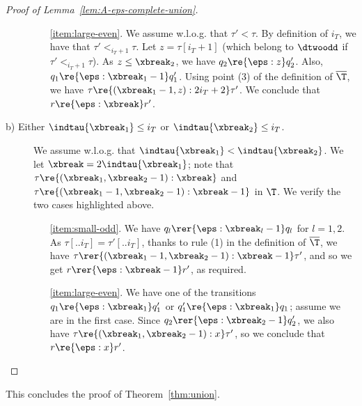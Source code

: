 \begin{proof}[Proof of Lemma~\ref{lem:A-eps-complete-union}]
\begin{description}
\begin{itemize}
            \item[\ref{item:large-even}.] We assume w.l.o.g. that $\tau' < \tau$.
            By definition of $i_T$, we have that $\tau' <_{i_T+1} \tau$. 
            Let $z = \tau[i_T+1]$ (which belong to $\dtwoodd$ if $\tau' <_{i_T+1} \tau$).
            As $z\leq \xbreak_2$, we have $q_2 \re{\eps:z} q'_2$. Also, $q_1 \re{\eps:\xbreak_1-1} q'_1$.
            Using point (3) of the definition of $\overline \T$, we have $\tau \re{(\xbreak_1-1,z):2i_T+2} \tau'$.
            We conclude that $r \re{\eps:\xbreak} r'$.
        \end{itemize}
        \item[ b) Either $\indtau{\xbreak_1}\leq i_T$ or $\indtau{\xbreak_2}\leq i_T$.]
        We assume w.l.o.g. that $\indtau{\xbreak_1} < \indtau{\xbreak_2}$.
        We let $\xbreak = 2 \indtau{\xbreak_1}$; note that $\tau \re {(\xbreak_1,\xbreak_2-1):\xbreak}$ and  $\tau \re {(\xbreak_1-1,\xbreak_2-1):\xbreak-1}$ in $\T$.
        We verify the two cases highlighted above.
        \begin{itemize}
            \item[\ref{item:small-odd}.]
            We have $q_l \rer{\eps:\xbreak_l-1} q_l$ for $l=1,2$.
            As $\tau[..i_T] = \tau'[..i_T]$, thanks to rule (1) in the definition of $\overline \T$, we have $\tau \rer{(\xbreak_1-1,\xbreak_2-1):\xbreak-1} \tau'$, and so we get $r \rer{\eps:\xbreak-1} r'$, as required.
            \item[\ref{item:large-even}.] We have one of the transitions $q_1 \re{\eps:\xbreak_1} q_1'$ or $q_1' \re{\eps:\xbreak_1} q_1$; assume we are in the first case. Since $q_2 \rer{\eps: \xbreak_2-1} q'_2$, we also have $\tau \re{(\xbreak_1,\xbreak_2-1):x} \tau'$, so we conclude that $r \re{\eps:x} r'$.\qedhere
        \end{itemize}
    \end{description}
\end{proof}

This concludes the proof of Theorem~\ref{thm:union}.